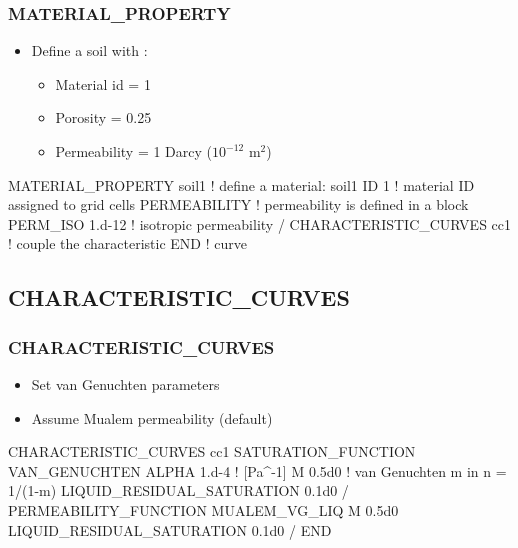 \documentclass{beamer}
\newcommand\bluecomment[1]{{{\color{blue} #1}}}
\newcommand\greencomment[1]{{{\color{green} #1}}}
\begin{document}
\begin{frame}\frametitle{MATERIAL\_PROPERTY}

\begin{itemize}
  \item Define a soil with :
  \begin{itemize}
    \item Material id = 1
    \item Porosity = 0.25
    \item Permeability = 1 Darcy ($10^{-12}$ m$^2$)
  \end{itemize}
\end{itemize}

\begin{semiverbatim}
MATERIAL_PROPERTY soil1  \bluecomment{! define a material:} \greencomment{soil1}
  ID 1             \bluecomment{! material ID assigned to grid cells}
  PERMEABILITY     \bluecomment{! permeability is defined in a block}
    PERM_ISO 1.d-12  \bluecomment{! isotropic permeability}
  /
  CHARACTERISTIC\_CURVES cc1  \bluecomment{! couple the characteristic}
END                        \bluecomment{!   curve}
\end{semiverbatim}

\end{frame}

\subsection{CHARACTERISTIC\_CURVES}

\begin{frame}[fragile]\frametitle{CHARACTERISTIC\_CURVES}

\begin{itemize}
\item Set van Genuchten parameters
\item Assume Mualem permeability (default)
\end{itemize}

\begin{semiverbatim}
CHARACTERISTIC_CURVES cc1
  SATURATION_FUNCTION VAN_GENUCHTEN
    ALPHA  1.d-4   \bluecomment{! [Pa^-1]}
    M 0.5d0        \bluecomment{! van Genuchten m in n = 1/(1-m)}
    LIQUID_RESIDUAL_SATURATION 0.1d0
  /
  PERMEABILITY_FUNCTION MUALEM_VG_LIQ
    M 0.5d0
    LIQUID_RESIDUAL_SATURATION 0.1d0
  /
END
\end{semiverbatim}

\end{frame}
\end{document}

